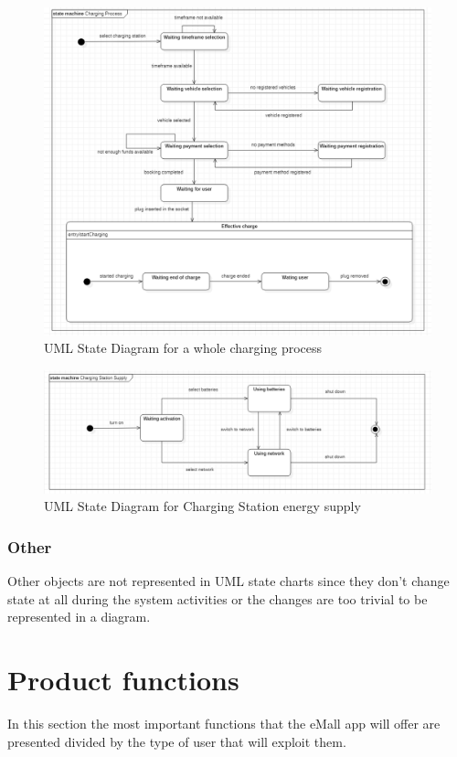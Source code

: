 \documentclass[a4paper]{report}
\begin{document}
\begin{figure}[p]
\includegraphics[width=\textwidth]{StateChartRASD}
\caption{UML State Diagram for a whole charging process}
\label{fig:state-diagramRASD}
\end{figure}

\begin{figure}[p]
\includegraphics[width=\textwidth]{ChargingStationSupplayStateChartRASD}
\caption{UML State Diagram for Charging Station energy supply}
\label{fig:state-diagramChargingRASD}
\end{figure}
\restoregeometry

\subsubsection{Other}
Other objects are not represented in UML state charts since they don't change state at all during the system activities or the changes are too trivial to be represented in a diagram.

\section{Product functions}
In this section the most important functions that the eMall app will offer are presented divided by the type of user that will exploit them.
\end{document}

